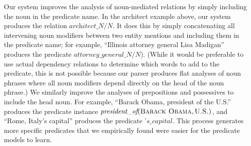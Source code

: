 \documentclass[11pt]{article}
\newcommand{\lexicalpredicate}[1]{\ensuremath{\textit{#1}}}
\newcommand{\entity}[1]{\ensuremath{\textsc{#1}}}
\begin{document}
Our system improves the analysis of noun-mediated relations by simply
including the noun in the predicate name. In the architect example
above, our system produces the relation
\lexicalpredicate{architect\_N/N}. It does this by simply
concatenating all intervening noun modifiers between two entity
mentions and including them in the predicate name; for example,
``Illinois attorney general Lisa Madigan'' produces the predicate
\lexicalpredicate{attorney\_general\_N/N}). (While it would be
preferable to use actual dependency relations to determine which words
to add to the predicate, this is not possible because our parser
produces flat analyses of noun phrases where all noun modifiers depend
directly on the head of the noun phrase.) We similarly improve the
analyses of prepositions and possessives to include the head noun. For
example, ``Barack Obama, president of the U.S.'' produces the
predicate instance $\lexicalpredicate{president\_of}(\entity{Barack
  Obama}, \entity{U.S.})$, and ``Rome, Italy's capital'' produces the
predicate \lexicalpredicate{'s\_capital}. This process generates more
specific predicates that we empirically found were easier for the
predicate models to learn.


\end{document}
